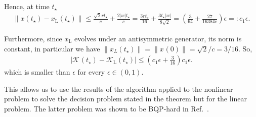 \documentclass[superscriptaddress,onecolumn,nofootinbib,longbibliography,a4paper,accepted=2026-09-29]{quantumarticle}
\theoremstyle{plain}
\theoremstyle{definition}
\numberwithin{thm}{section}
\numberwithin{assumption}{section}
\numberwithin{lemma}{section}
\numberwithin{prop}{section}
\numberwithin{cor}{section}
\numberwithin{definition}{section}
\numberwithin{rmk}{section}
\numberwithin{equation}{section}
\begin{document}
 Hence, at time $t_\star$
 \begin{align}
     \|x(t_\star) - x_\mathrm{L}(t_\star)\|  \leq  \frac{\sqrt{2}r t_\star}{c}  + \frac{2|w| t_\star}{c} = \frac{3 r t_\star}{16} + \frac{3 t_\star |w| }{8 \sqrt{2}} = \left(\frac{3}{64}+ \frac{27}{16384 e}\right)\epsilon=: c_1 \epsilon.
 \end{align}


Furthermore, since $x_\mathrm{L}$ evolves under an antisymmetric generator, its norm is constant, in particular we have $\| x_L(t_\star)\| = \| x_{}(0)\|= \sqrt{2}/c = 3/16$. So,
\begin{align}
    |\mathcal{K}_{}(t_\star) -   \mathcal{K}_{\mathrm{L}}(t_\star)| \leq \left(c_1 \epsilon + \frac{3}{16}\right) c_1 \epsilon.
\end{align}
which is smaller than $\epsilon$ for every $\epsilon \in (0,1)$.

This allows us to use the results of the algorithm applied to the nonlinear problem to solve the decision problem stated in the theorem but for the linear problem. The latter problem was shown to be BQP-hard in Ref.~\cite{babbush2023exponential}.




\end{document}
